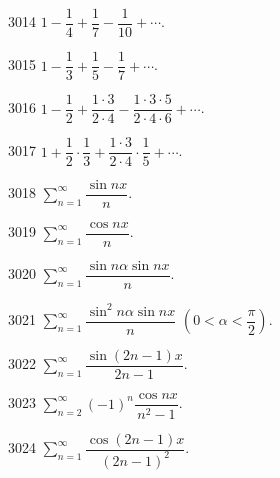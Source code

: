 
\begin{prob}[S]{3014}
$1 - \dfrac{1}{4} + \dfrac{1}{7} - \dfrac{1}{10} + \cdots$.
\end{prob}

\begin{prob}[S]{3015}
$1 - \dfrac{1}{3} + \dfrac{1}{5} - \dfrac{1}{7} + \cdots$.
\end{prob}

\begin{prob}[S]{3016}
$1 - \dfrac{1}{2} + \dfrac{1\cdot 3}{2\cdot 4} - \dfrac{1\cdot 3\cdot 5}{2\cdot 4\cdot 6} + \cdots$.
\end{prob}

\begin{prob}[S]{3017}
$1 + \dfrac{1}{2} \cdot \dfrac{1}{3} + \dfrac{1\cdot 3}{2\cdot 4} \cdot \dfrac{1}{5} + \cdots$.
\end{prob}


\begin{prob}[S]{3018}
$\sum\limits_{n=1}^{\infty} \dfrac{\sin nx}{n}$.
\end{prob}

\begin{prob}[S]{3019}
$\sum\limits_{n=1}^{\infty} \dfrac{\cos nx}{n}$.
\end{prob}

\begin{prob}[S]{3020}
$\sum\limits_{n=1}^{\infty} \dfrac{\sin n\alpha \sin nx}{n}$.
\end{prob}

\begin{prob}[S]{3021}
$\sum\limits_{n=1}^{\infty} \dfrac{\sin^2 n\alpha \sin nx}{n}$ $\left(0 < \alpha < \dfrac{\pi}{2}\right)$.
\end{prob}

\begin{prob}[S]{3022}
$\sum\limits_{n=1}^{\infty} \dfrac{\sin(2n-1)x}{2n-1}$.
\end{prob}

\begin{prob}[S]{3023}
$\sum\limits_{n=2}^{\infty} (-1)^n \dfrac{\cos nx}{n^2 - 1}$.
\end{prob}

\begin{prob}[S]{3024}
$\sum\limits_{n=1}^{\infty} \dfrac{\cos(2n-1)x}{(2n-1)^2}$.
\end{prob}

